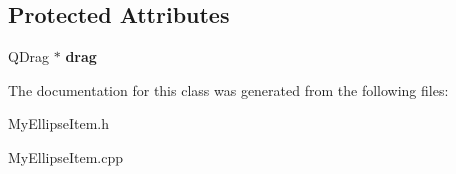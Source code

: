 \subsection*{Protected Attributes}
\begin{DoxyCompactItemize}
\item 
\hypertarget{class_my_ellipse_item_a70624351d663b438ec225b3cb0eba7d9}{}Q\+Drag $\ast$ {\bfseries drag}\label{class_my_ellipse_item_a70624351d663b438ec225b3cb0eba7d9}

\end{DoxyCompactItemize}


The documentation for this class was generated from the following files\+:\begin{DoxyCompactItemize}
\item 
My\+Ellipse\+Item.\+h\item 
My\+Ellipse\+Item.\+cpp\end{DoxyCompactItemize}
